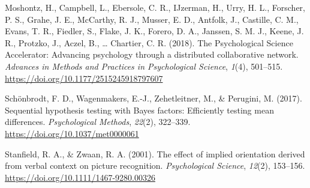\documentclass[
  man,floatsintext]{apa6}
\newlength{\cslhangindent}
\newlength{\cslentryspacingunit} %
\newenvironment{CSLReferences}[2] %
 {%
  \setlength{\parindent}{0pt}
  \ifodd #1
  \let\oldpar\par
  \def\par{\hangindent=\cslhangindent\oldpar}
  \fi
  \setlength{\parskip}{#2\cslentryspacingunit}
 }%
 {}
\begin{document}
\begin{CSLReferences}{1}{0}
\leavevmode{}%
Moshontz, H., Campbell, L., Ebersole, C. R., IJzerman, H., Urry, H. L., Forscher, P. S., Grahe, J. E., McCarthy, R. J., Musser, E. D., Antfolk, J., Castille, C. M., Evans, T. R., Fiedler, S., Flake, J. K., Forero, D. A., Janssen, S. M. J., Keene, J. R., Protzko, J., Aczel, B., \ldots{} Chartier, C. R. (2018). The {Psychological Science Accelerator}: {Advancing} psychology through a distributed collaborative network. \emph{Advances in Methods and Practices in Psychological Science}, \emph{1}(4), 501--515. \url{https://doi.org/10.1177/2515245918797607}

\leavevmode{}%
Schönbrodt, F. D., Wagenmakers, E.-J., Zehetleitner, M., \& Perugini, M. (2017). Sequential hypothesis testing with {Bayes} factors: {Efficiently} testing mean differences. \emph{Psychological Methods}, \emph{22}(2), 322--339. \url{https://doi.org/10.1037/met0000061}

\leavevmode{}%
Stanfield, R. A., \& Zwaan, R. A. (2001). The effect of implied orientation derived from verbal context on picture recognition. \emph{Psychological Science}, \emph{12}(2), 153--156. \url{https://doi.org/10.1111/1467-9280.00326}

\end{CSLReferences}

\endgroup
\end{document}

